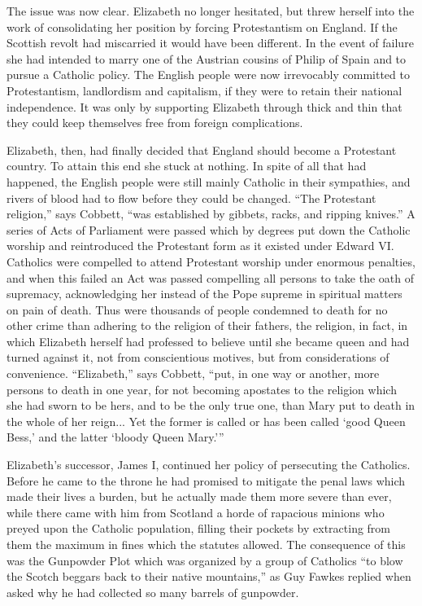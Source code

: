 \documentclass{book}
\begin{document}
The issue was now clear. Elizabeth no longer hesitated, but threw herself into the work of consolidating her position by forcing Protestantism on England. If the Scottish revolt had miscarried it would have been different. In the event of failure she had intended to marry one of the Austrian cousins of Philip of Spain and to pursue a Catholic policy. The English people were now irrevocably committed to Protestantism, landlordism and capitalism, if they were to retain their national independence. It was only by supporting Elizabeth through thick and thin that they could keep themselves free from foreign complications.

Elizabeth, then, had finally decided that England should become a Protestant country. To attain this end she stuck at nothing. In spite of all that had happened, the English people were still mainly Catholic in their sympathies, and rivers of blood had to flow before they could be changed. “The Protestant religion,” says Cobbett, “was established by gibbets, racks, and ripping knives.” A series of Acts of Parliament were passed which by degrees put down the Catholic worship and reintroduced the Protestant form as it existed under Edward VI. Catholics were compelled to attend Protestant worship under enormous penalties, and when this failed an Act was passed compelling all persons to take the oath of supremacy, acknowledging her instead of the Pope supreme in spiritual matters on pain of death. Thus were thousands of people condemned to death for no other crime than adhering to the religion of their fathers, the religion, in fact, in which Elizabeth herself had professed to believe until she became queen and had turned against it, not from conscientious motives, but from considerations of convenience. “Elizabeth,” says Cobbett, “put, in one way or another, more persons to death in one year, for not becoming apostates to the religion which she had sworn to be hers, and to be the only true one, than Mary put to death in the whole of her reign... Yet the former is called or has been called ‘good Queen Bess,’ and the latter ‘bloody Queen Mary.’”\footnotemark[4]

Elizabeth’s successor, James I, continued her policy of persecuting the Catholics. Before he came to the throne he had promised to mitigate the penal laws which made their lives a burden, but he actually made them more severe than ever, while there came with him from Scotland a horde of rapacious minions who preyed upon the Catholic population, filling their pockets by extracting from them the maximum in fines which the statutes allowed. The consequence of this was the Gunpowder Plot which was organized by a group of Catholics “to blow the Scotch beggars back to their native mountains,” as Guy Fawkes replied when asked why he had collected so many barrels of gunpowder.
\end{document}
